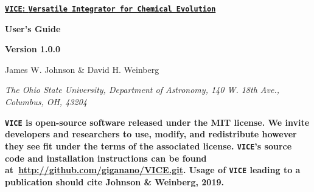 \documentclass{report}
\begin{document}
\hypertarget{top}{}
\begin{center}
\underline{\LARGE
	\textbf{\texttt{VICE}: \texttt{Versatile Integrator for Chemical 
	Evolution}}
}
\par\null\par
{\LARGE \textbf{User's Guide}}
\par\null\par
{\Large \textbf{Version 1.0.0}}
\par\null\par
{\Large
James W. Johnson \& David H. Weinberg 
} \par
\textit{The Ohio State University, Department of Astronomy, 140 W. 18th 
Ave., Columbus, OH, 43204}

\par\null\par\noindent
\textbf{\texttt{VICE} is open-source software released under the MIT license. 
We invite developers and researchers to use, modify, and redistribute however 
they see fit under the terms of the associated license. \texttt{VICE}'s source 
code and installation instructions can be found 
at~\url{http://github.com/giganano/VICE.git}. Usage of \texttt{VICE} leading 
to a publication should cite Johnson \& Weinberg, 2019. }
\end{center}
\end{document}
